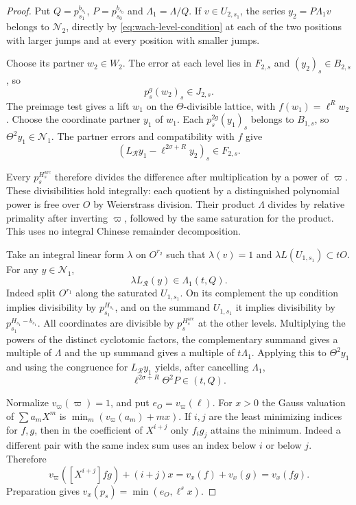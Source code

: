 \begin{proof}
Put \(Q=p_{s_1}^{b_{s_1}}\), \(P=p_{s_0}^{b_{s_0}}\) and
\(\Lambda_1=\Lambda/Q\). If \(v\in U_{2,s_1}\), the series
\(y_2=P\Lambda_1 v\) belongs to \(\mathcal N_2\), directly
by \eqref{eq:wach-level-condition} at each of the two positions with larger jumps and at every position with smaller jumps.

Choose its partner \(w_2\in W_2\). The error at each level lies
in \(F_{2,s}\) and \((y_2)_s\in B_{2,s}\), so
\[
 p_s^g(w_2)_s\in J_{2,s}.
\]
The preimage test gives a lift
\(w_1\) on the \(\Theta\)-divisible lattice, with
\(f(w_1)=\ell^R w_2\). Choose the coordinate partner \(y_1\)
of \(w_1\). Each \(p_s^{2g}(y_1)_s\) belongs to \(B_{1,s}\),
so \(\Theta^2 y_1\in\mathcal N_1\).
The partner errors and compatibility with \(f\) give
\[
 (L_{\mathcal R}y_1-\ell^{2\sigma+R}y_2)_s\in F_{2,s}.
\]

Every \(p_s^{H_s^{\mathrm{arc}}}\) therefore divides the difference after
multiplication by a power of \(\varpi\). These divisibilities
hold integrally: each quotient by a distinguished polynomial
power is free over \(O\) by Weierstrass division. Their product
\(\Lambda\) divides by relative primality after inverting
\(\varpi\), followed by the same saturation for the product.
This uses no integral Chinese remainder decomposition.

Take an integral linear form \(\lambda\) on \(O^{r_2}\)
such that \(\lambda(v)=1\) and
\(\lambda L(U_{1,s_1})\subset tO\).
For any \(y\in\mathcal N_1\),
\[
                 \lambda L_{\mathcal R}(y)
                   \in \Lambda_1(t,Q).
\]
Indeed split \(O^{r_1}\) along the saturated \(U_{1,s_1}\).
On its complement the up condition implies divisibility by
\(p_{s_1}^{H_{s_1}}\), and on the summand \(U_{1,s_1}\) it
implies divisibility by \(p_{s_1}^{H_{s_1}-b_{s_1}}\).
All coordinates are divisible by \(p_s^{H_s^{\mathrm{arc}}}\) at the other
levels. Multiplying the powers of the distinct cyclotomic factors, the complementary
summand gives a multiple of \(\Lambda\) and the up summand gives
a multiple of \(t\Lambda_1\). Applying this to
\(\Theta^2 y_1\) and using the congruence for
\(L_{\mathcal R}y_1\) yields, after cancelling \(\Lambda_1\),
\begin{equation}\label{eq:wach-gauss-ideal}
                 \ell^{2\sigma+R}\Theta^2P\in(t,Q).
\end{equation}

Normalize \(v_\varpi(\varpi)=1\), and put \(e_O=v_\varpi(\ell)\).
For \(x>0\) the Gauss valuation of \(\sum a_m X^m\) is
\(\min_m(v_\varpi(a_m)+mx)\). If \(i,j\) are the least minimizing indices for \(f,g\), then in
the coefficient of \(X^{i+j}\) only \(f_i g_j\) attains the minimum.
Indeed a different pair with the same index sum uses an index below
\(i\) or below \(j\). Therefore
\[
 v_\varpi([X^{i+j}]fg)+(i+j)x=v_x(f)+v_x(g)=v_x(fg).
\] Preparation gives
\(v_x(p_s)=\min(e_O,\ell^s x)\).


\end{proof}
